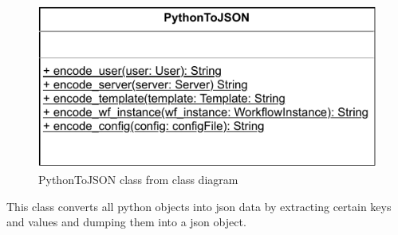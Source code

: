 
\begin{figure}[h]
        \centerline{\includegraphics[scale=1]{res/Klassen/PythonToJson.pdf}}
        \caption{PythonToJSON class from class diagram}
\end{figure}

This class converts all python objects into json data by extracting certain keys and values and dumping
them into a json object.

